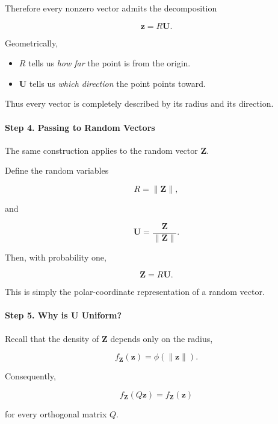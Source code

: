 \documentclass[11pt]{article}
\begin{document}
\begin{mdframed}[
		linewidth=0.8pt,
		roundcorner=6pt,
		backgroundcolor=gray!5,
		linecolor=gray!60,
		innertopmargin=10pt,
		innerbottommargin=10pt,
		innerleftmargin=10pt,
		innerrightmargin=10pt
		]
		Therefore every nonzero vector admits the decomposition
		
		\[
		\boxed{
			\mathbf z
			=
			R\mathbf U.
		}
		\]
		
		Geometrically,
		
		\begin{itemize}
			\item $R$ tells us \emph{how far} the point is from the origin.
			\item $\mathbf U$ tells us \emph{which direction} the point points toward.
		\end{itemize}
		
		Thus every vector is completely described by its radius and its direction.
		
		\vspace{0.3cm}
		
		\paragraph{Step 4. Passing to Random Vectors}
		
		The same construction applies to the random vector $\mathbf Z$.
		
		Define the random variables
		
		\[
		R=\|\mathbf Z\|,
		\]
		
		and
		
		\[
		\mathbf U
		=
		\frac{\mathbf Z}{\|\mathbf Z\|}.
		\]
		
		Then, with probability one,
		
		\[
		\boxed{
			\mathbf Z
			=
			R\mathbf U.
		}
		\]
		
		This is simply the polar-coordinate representation of a random vector.
		
		\vspace{0.3cm}
		
		\paragraph{Step 5. Why is $\mathbf U$ Uniform?}
		
		Recall that the density of $\mathbf Z$ depends only on the radius,
		
		\[
		f_{\mathbf Z}(\mathbf z)
		=
		\phi(\|\mathbf z\|).
		\]
		
		Consequently,
		
		\[
		f_{\mathbf Z}(Q\mathbf z)
		=
		f_{\mathbf Z}(\mathbf z)
		\]
		
		for every orthogonal matrix $Q$.
		

\end{mdframed}
\end{document}
